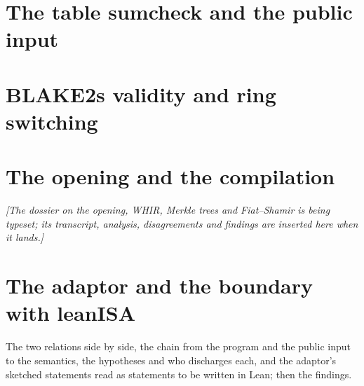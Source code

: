 \section{The table sumcheck and the public input}\label{sec:faith-table}\label{sec:faith-pub}


\section{BLAKE2s validity and ring switching}\label{sec:faith-flock}


\section{The opening and the compilation}\label{sec:faith-opening}

\ifopeningready
{}
\else\emph{[The dossier on the opening, WHIR, Merkle trees and Fiat--Shamir is being typeset;
its transcript, analysis, disagreements and findings are inserted here when it lands.]}\fi

\section{The adaptor and the boundary with leanISA}\label{sec:faith-adaptor}

The two relations side by side, the chain from the program and the public input to the
semantics, the hypotheses and who discharges each, and the adaptor's sketched statements read
as statements to be written in Lean; then the findings.

